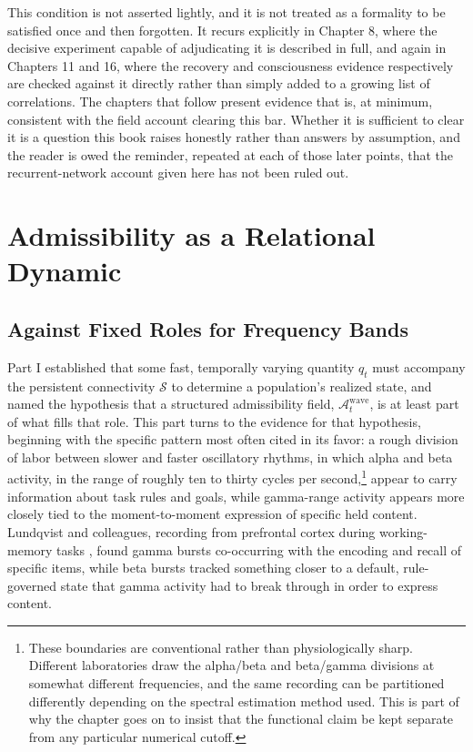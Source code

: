 \documentclass[11pt]{book}
\begin{document}
This condition is not asserted lightly, and it is not treated as a formality to be satisfied once and then forgotten. It recurs explicitly in Chapter 8, where the decisive experiment capable of adjudicating it is described in full, and again in Chapters 11 and 16, where the recovery and consciousness evidence respectively are checked against it directly rather than simply added to a growing list of correlations. The chapters that follow present evidence that is, at minimum, consistent with the field account clearing this bar. Whether it is sufficient to clear it is a question this book raises honestly rather than answers by assumption, and the reader is owed the reminder, repeated at each of those later points, that the recurrent-network account given here has not been ruled out.

\part{Admissibility as a Relational Dynamic}

\chapter{Against Fixed Roles for Frequency Bands}

Part I established that some fast, temporally varying quantity $q_t$ must accompany the persistent connectivity $\mathcal S$ to determine a population's realized state, and named the hypothesis that a structured admissibility field, $\mathcal A_t^{\mathrm{wave}}$, is at least part of what fills that role. This part turns to the evidence for that hypothesis, beginning with the specific pattern most often cited in its favor: a rough division of labor between slower and faster oscillatory rhythms, in which alpha and beta activity, in the range of roughly ten to thirty cycles per second,\footnote{These boundaries are conventional rather than physiologically sharp. Different laboratories draw the alpha/beta and beta/gamma divisions at somewhat different frequencies, and the same recording can be partitioned differently depending on the spectral estimation method used. This is part of why the chapter goes on to insist that the functional claim be kept separate from any particular numerical cutoff.} appear to carry information about task rules and goals, while gamma-range activity appears more closely tied to the moment-to-moment expression of specific held content. Lundqvist and colleagues, recording from prefrontal cortex during working-memory tasks \cite{lundqvist2016}, found gamma bursts co-occurring with the encoding and recall of specific items, while beta bursts tracked something closer to a default, rule-governed state that gamma activity had to break through in order to express content.
\end{document}
